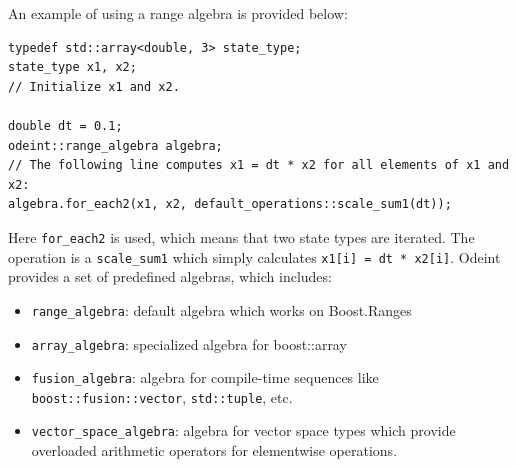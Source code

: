 \documentclass[1p]{elsarticle}
\newcommand{\code}[1]{\lstinline|#1|}
\newcommand {\rem}[1]{}
\begin{document}
\rem{
To see how this works consider an implementation of the Euler method.
\begin{lstlisting}
template< class State , class Algebra , class Operations >
class euler
{
    // ...
    template< class Ode >
    void do_step( Ode ode , State &x , time_type t , time_type dt )
    {
        ode( x , m_dxdt , dt );
        Algebra::for_each3( x , x , m_dxdt , Operations::scale_sum2( 1.0 , dt ) );
    }
};
\end{lstlisting}
The state type, the algebra, and the operations enter the stepper as
template parameter, hence they are exchangeable. The function object
ode represents the ODE and must be provided by the user. It calculates
the r.h.s.~ of \eqref{eq:ode} and stores the result in
\code{m_dxdt}. The call of \code{for_each3} iterates three vectors and
applies on each element \code{scale_sum2}. In this specific case it
calculates $x(t+\Delta t) = x(t) + dt * f(x(t) , t)$ which is exactly
Euler formula. Note, that the operation is here in-place, meaning that
$x$ is updated to the new value.

The main point here is, that no specific arithmetic operation is yet
specified. All arithmetic calculations and iterations are completely
encapsulated into the algebra and the operations which must be
provided by the user. Note, that algebra and the operations must be
choosen such that they work with interact correctly with the state
type.
}



An example of using a range algebra is provided below:
\begin{lstlisting}
typedef std::array<double, 3> state_type;
state_type x1, x2;
// Initialize x1 and x2.

double dt = 0.1;
odeint::range_algebra algebra;
// The following line computes x1 = dt * x2 for all elements of x1 and x2:
algebra.for_each2(x1, x2, default_operations::scale_sum1(dt));
\end{lstlisting}
Here \code{for_each2} is used, which means that
two state types are iterated. The operation is a \code{scale_sum1} which simply
calculates \code{x1[i] = dt * x2[i]}. Odeint provides a set of predefined
algebras, which includes:
\begin{itemize}
    \item \code{range_algebra}: default algebra which works on Boost.Ranges
    \item \code{array_algebra}: specialized algebra for boost::array
    \item \code{fusion_algebra}: algebra for compile-time sequences like
        \code{boost::fusion::vector}, \code{std::tuple}, etc.
    \item \code{vector_space_algebra}: algebra for vector space types which
        provide overloaded arithmetic operators for elementwise operations.
\end{itemize}
\end{document}

